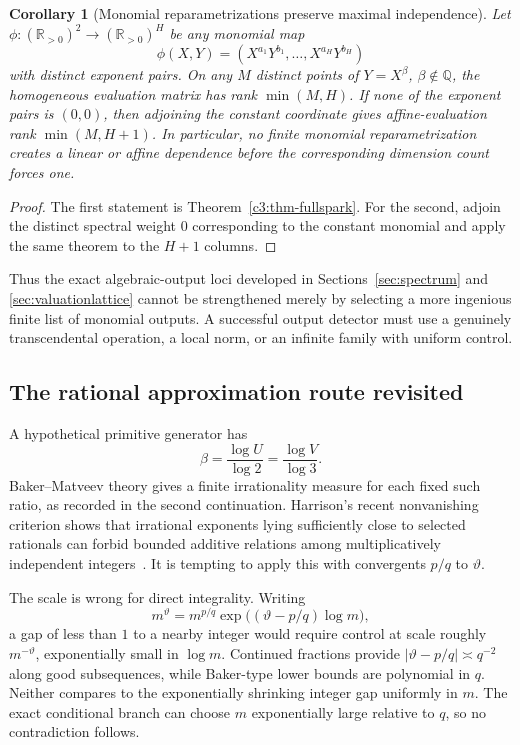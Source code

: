\documentclass[11pt,oneside]{article}
\newtheorem{corollary}[theorem]{Corollary}
\theoremstyle{definition}
\theoremstyle{remark}
\newcommand{\Q}{\mathbb Q}
\newcommand{\R}{\mathbb R}
\newcommand{\thetaq}{\vartheta}
\begin{document}
\begin{corollary}[Monomial reparametrizations preserve maximal independence]
\label{c3:cor-no-projection}
Let $\phi:(\R_{>0})^2\to(\R_{>0})^H$ be any monomial map
\[
 \phi(X,Y)=(X^{a_1}Y^{b_1},\ldots,X^{a_H}Y^{b_H})
\]
with distinct exponent pairs.  On any $M$ distinct points of
$Y=X^\beta$, $\beta\notin\Q$, the homogeneous evaluation matrix has rank
$\min(M,H)$.  If none of the exponent pairs is $(0,0)$, then adjoining the constant
coordinate gives affine-evaluation rank $\min(M,H+1)$.  In particular, no finite monomial
reparametrization creates a linear or affine dependence before the corresponding dimension
count forces one.
\end{corollary}

\begin{proof}
The first statement is Theorem~\ref{c3:thm-fullspark}.  For the second, adjoin the distinct
spectral weight $0$ corresponding to the constant monomial and apply the same theorem to the
$H+1$ columns.
\end{proof}

Thus the exact algebraic-output loci developed in Sections~\ref{sec:spectrum} and
\ref{sec:valuationlattice} cannot be strengthened merely by selecting a more ingenious finite
list of monomial outputs.  A successful output detector must use a genuinely transcendental
operation, a local norm, or an infinite family with uniform control.

\subsection{The rational approximation route revisited}

A hypothetical primitive generator has
\[
 \beta=\frac{\log U}{\log2}=\frac{\log V}{\log3}.
\]
Baker--Matveev theory gives a finite irrationality measure for each fixed such ratio, as
recorded in the second continuation.  Harrison's recent nonvanishing criterion shows that
irrational exponents lying sufficiently close to selected rationals can forbid bounded
additive relations among multiplicatively independent integers~\cite{Harrison2026}.  It is
tempting to apply this with convergents $p/q$ to $\thetaq$.

The scale is wrong for direct integrality.  Writing
\[
 m^{\thetaq}=m^{p/q}\exp\bigl((\thetaq-p/q)\log m\bigr),
\]
a gap of less than $1$ to a nearby integer would require control at scale roughly
$m^{-\thetaq}$, exponentially small in $\log m$.  Continued fractions provide
$|\thetaq-p/q|\asymp q^{-2}$ along good subsequences, while Baker-type lower bounds are
polynomial in $q$.  Neither compares to the exponentially shrinking integer gap uniformly in
$m$.  The exact conditional branch can choose $m$ exponentially large relative to $q$, so no
contradiction follows.
\end{document}
